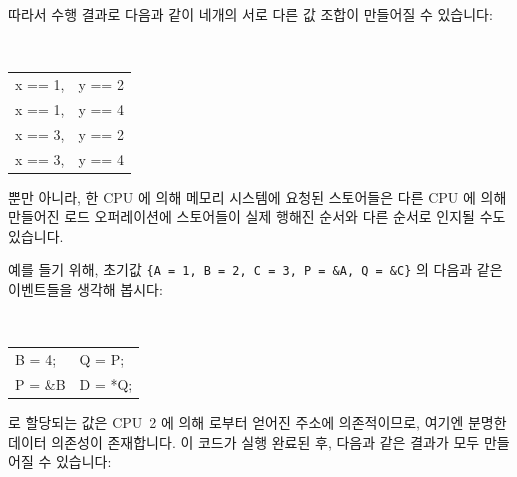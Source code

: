 따라서 수행 결과로 다음과 같이 네개의 서로 다른 값 조합이 만들어질 수 있습니다:

\vspace{5pt}
\begin{minipage}[t]{\columnwidth}
\tt
\scriptsize
\begin{tabular}{ll}
	x == 1, & y == 2 \\
	x == 1, & y == 4 \\
	x == 3, & y == 2 \\
	x == 3, & y == 4 \\
\end{tabular}
\end{minipage}
\vspace{5pt}

뿐만 아니라, 한 CPU 에 의해 메모리 시스템에 요청된 스토어들은 다른 CPU 에 의해
만들어진 로드 오퍼레이션에 스토어들이 실제 행해진 순서와 다른 순서로 인지될
수도 있습니다.

예를 들기 위해, 초기값 {\tt \{A = 1, B = 2, C = 3, P = \&A, Q = \&C\}} 의
다음과 같은 이벤트들을 생각해 봅시다:

\vspace{5pt}
\begin{minipage}[t]{\columnwidth}
\tt
\scriptsize
\begin{tabular}{l|l}
	\nf{CPU 1} &	\nf{CPU 2} \\
	\hline
	B = 4; &	Q = P; \\
	P = \&B &	D = *Q; \\
\end{tabular}
\end{minipage}
\vspace{5pt}

 로 할당되는 값은 CPU~2 에 의해  로부터 얻어진 주소에 의존적이므로,
여기엔 분명한 데이터 의존성이 존재합니다.
이 코드가 실행 완료된 후, 다음과 같은 결과가 모두 만들어질 수 있습니다:

